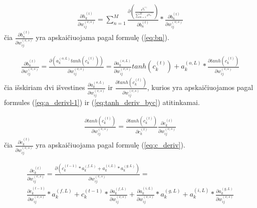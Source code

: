 \begin{equation} \label{eq:hn}
  \begin{aligned}
  \frac{\partial h_k^{(t)}}{\partial w_{ij}^{(v,s)}}
  =
  \sum_{n=1}^{M}
  \frac{\partial (\frac{e^{b_k^{(t)}}}{\sum_{m=1}^{M} e^{b_m^{(t)}}})}
  {\partial b_n^{(t)}}
  *
   \frac{\partial b_n^{(t)}}{\partial w_{ij}^{(v,s)}}
   \end{aligned}
\end{equation}
čia \begin{math}\frac{\partial b_n^{(t)}}{\partial w_{ij}^{(v,s)}}\end{math} yra apskaičiuojama pagal formulę (\ref{eq:bn}).




\begin{equation} \label{eq:bn}
  \begin{aligned}
  \frac{\partial b_n^{(t)}}{\partial w_{ij}^{(v,s)}}
  =
  \frac{\partial (a_k^{(o,L)} tanh(c_k^{(t)}))}{\partial w_{ij}^{(v,s)}}
  =
  \frac{\partial a_k^{(o,L)}}{\partial w_{ij}^{(v,s)}} tanh(c_k^{(t)}) +
  a_k^{(o,L)} * \frac{\partial tanh(c_k^{(t)})}{\partial w_{ij}^{(v,s)}}
  \end{aligned}
\end{equation}
čia išskiriam dvi išvestines \begin{math}\frac{\partial a_k^{(o,L)}}{\partial w_{ij}^{(v,s)}}\end{math} ir \begin{math}\frac{\partial tanh(c_k^{(t)})}{\partial w_{ij}^{(v,s)}}\end{math}, kurios yra apskaičiuojamos pagal formules (\ref{eq:a_derivl-1}) ir (\ref{eq:tanh_deriv_byc}) atitinkamai.


\begin{equation} \label{eq:tanh_deriv_byc}
  \begin{aligned}
  \frac{\partial tanh(c_k^{(t)})}{\partial w_{ij}^{(v,s)}} =
  \frac{\partial tanh(c_k^{(t)})}{\partial c_k^{(t)}}
  \frac{\partial c_k^{(t)}}{\partial w_{ij}^{(v,s)}}
  \end{aligned}
\end{equation}
čia \begin{math}\frac{\partial c_k^{(t)}}{\partial w_{ij}^{(v,s)}}\end{math} yra apskaičiuojama pagal formulę (\ref{eq:c_deriv}).


\begin{equation} \label{eq:c_deriv}
  \begin{aligned}
  \frac{\partial c_k^{(t)}}{\partial w_{ij}^{(v,s)}} =
  \frac{\partial (c_k^{(t-1)}*a_k^{(f,L)}+a_k^{(i,L)}*a_k^{(g,L)})}{\partial w_{ij}^{(v,s)}} =\\
  \frac{ \partial c_k^{(t-1)}}{\partial w_{ij}^{(v,s)}}* a_k^{(f,L)} +
  c_k^{(t-1)} * \frac{\partial a_k^{(f,L)}}{\partial w_{ij}^{(v,s)}} +
  \frac{\partial a_k^{(i,L)}}{\partial w_{ij}^{(v,s)}} * a_k^{(g,L)} +
  a_k^{(i,L)} * \frac{\partial a_k^{(g,L)}}{\partial w_{ij}^{(v,s)}}
  \end{aligned}
\end{equation}

